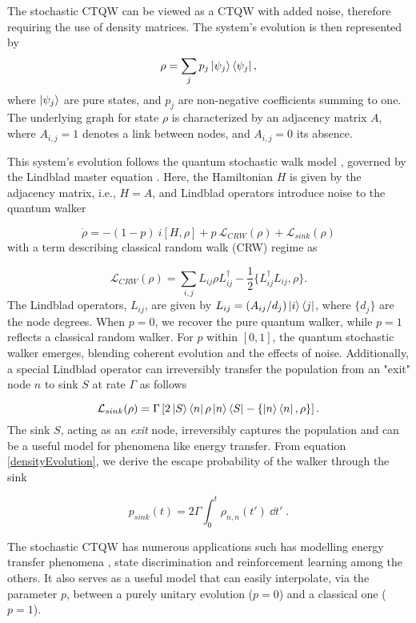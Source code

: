 \documentclass[main.tex]{subfiles}
\begin{document}
The stochastic CTQW can be viewed as a CTQW with added noise, therefore
requiring the use of density matrices. The system's evolution is then
represented by 
\begin{equation}
    \rho = \sum_j p_j\ket{\psi_j}\bra{\psi_j},
\end{equation}
where $\ket{\psi_j}$ are pure states, and $p_j$ are non-negative
coefficients summing to one. The underlying graph for state $\rho$ is
characterized by an adjacency matrix $A$, where $A_{i,j}=1$ denotes a link
between nodes, and $A_{i,j}=0$ its absence.

This system's evolution follows the quantum stochastic walk model
\cite{whitfield2010, Caruso2014}, governed by the Lindblad master equation
\cite{Lindblad1976}. Here, the Hamiltonian $H$ is given by the 
adjacency matrix, i.e., $H=A$, and Lindblad operators introduce noise to the
quantum walker

\begin{equation}
    {\dot \rho} = -(1-p)\ i[H,\rho] + p\  \mathcal{L}_{CRW} (\rho) + \mathcal{L}_{sink} (\rho)
    \label{densityEvolution}
\end{equation}
with a term describing classical random walk (CRW) regime as

\begin{equation}
    \mathcal{L}_{CRW} (\rho) = \sum_{i,j} L_{ij} \rho L_{ij}^{\dagger} - \frac{1}{2} \{L_{ij}^\dagger L_{ij}, \rho\}.
\end{equation}
The Lindblad operators, $L_{ij}$, are given by $L_{ij} =
(A_{ij}/d_j)\ket{i}\bra{j}$, where $\lbrace d_j \rbrace$ are the node degrees.
When $p=0$, we recover the pure quantum walker, while $p=1$ reflects a
classical random walker. For $p$ within $[0,1]$, the quantum stochastic walker
emerges, blending coherent evolution and the effects of noise. Additionally, a
special Lindblad operator can irreversibly transfer the population from an
"exit" node $n$ to sink $S$ at rate $\Gamma$ as follows

\begin{equation}
    \mathcal{L}_{sink} (\rho) = \Gamma \left [ 2\ket{S}\bra{n}\rho \ket{n} \bra{S} - \{\ket{n}\bra{n}, \rho\} \right ].
\end{equation}
The sink \(S\), acting as an \emph{exit} node, irreversibly captures the
population and can be a useful model for phenomena like energy transfer. From
equation \eqref{densityEvolution}, we derive the escape probability of the walker
through the sink

\begin{equation}
    p_{sink}(t) = 2 \Gamma \int_0^t \rho_{n,n}(t') \ \dd t' \; .
\end{equation}

The stochastic CTQW has numerous applications such has modelling energy
transfer phenomena \cite{Caruso2009}, state discrimination \cite{Pozza2020} and
reinforcement learning \cite{Pozza2022,Buffoni2020} among the others. It also
serves as a useful model that can easily interpolate, via the parameter $p$,
between a purely unitary evolution ($p=0$) and a classical one ($p=1$).
\end{document}
